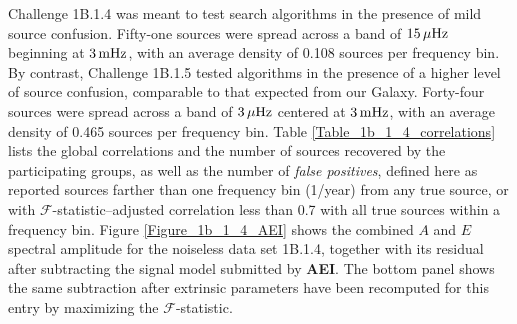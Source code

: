 \documentclass{iopart}
\begin{document}
Challenge 1B.1.4 was meant to test search algorithms in the presence of mild source confusion. Fifty-one sources were spread across a band of $15\, \mu{\rm Hz}$ beginning at $3\, {\rm mHz}$, with an average density of 0.108 sources per frequency bin. By contrast, Challenge 1B.1.5 tested algorithms in the presence of a higher level of source confusion, comparable to that expected from our Galaxy. Forty-four sources were spread across a band of $3\, \mu{\rm Hz}$ centered at $3\, {\rm mHz}$, with an average density of 0.465 sources per frequency bin. Table \ref{Table_1b_1_4_correlations} lists the global correlations and the number of sources recovered by the participating groups, as well as the number of \emph{false positives}, defined here as reported sources farther than one frequency bin (1/year) from any true source, or with $\mathcal{F}$-statistic--adjusted correlation less than 0.7 with all true sources within a frequency bin.
Figure \ref{Figure_1b_1_4_AEI} shows the combined $A$ and $E$ spectral amplitude for the noiseless data set 1B.1.4, together with its residual after subtracting the signal model submitted by \textbf{AEI}. The bottom panel shows the same subtraction after extrinsic parameters have been recomputed for this entry by maximizing the $\mathcal{F}$-statistic.
\end{document}
